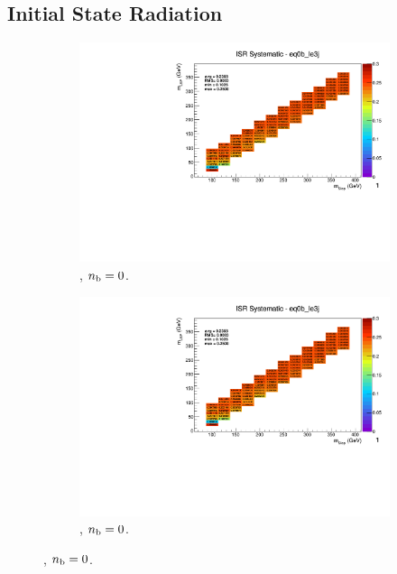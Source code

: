 \newpage
\subsection*{Initial State Radiation}
\label{sec:t2degen_isr_plots}

\begin{figure}[ht!]
  \centering
  \begin{subfigure}[b]{0.32\textwidth}
    \includegraphics[width=\textwidth, page=12]{Figs/sms/t2degen/v19/systs/T2_4body_ISR_eq0b_le3j.pdf}
    \caption{\njlow, $n_{\text{b}} = 0$.}
  \end{subfigure}
  \begin{subfigure}[b]{0.32\textwidth}
    \includegraphics[width=\textwidth, page=8]{Figs/sms/t2degen/v19/systs/T2_4body_ISR_eq0b_le3j.pdf}
    \caption{\njlow, $n_{\text{b}} = 0$.}

\end{subfigure}
\end{figure}
